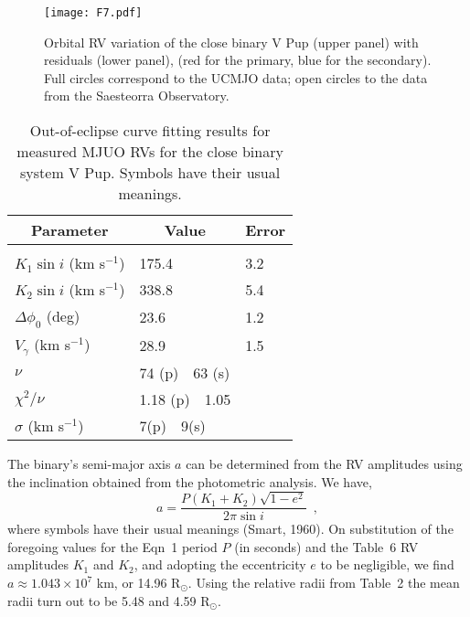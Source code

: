\documentclass[useAMS,usenatbib]{mnras}                                                                           \usepackage[pdftex]{graphicx}
\begin{document}
\begin{figure}
\label{fig-8}
\centering
\texttt{[image: F7.pdf]}\\
\caption{Orbital RV variation of the close binary V Pup (upper panel)
with residuals (lower panel),
(red for the primary, blue for the secondary).
Full circles correspond to the UCMJO data; open circles to the 
data from the Saesteorra Observatory.
}
\end{figure}
 
\begin{table}
\begin{center}
\caption{Out-of-eclipse curve fitting results for
measured MJUO RVs for the close binary system V Pup. 
Symbols have their usual meanings.
\label{tbl-6a}} 
\begin{tabular}{lll}
\hline 
\multicolumn{1}{c}{Parameter}  & \multicolumn{1}{c}{Value}  & 
\multicolumn{1}{c}{Error}\\
\hline \\
$K_1 \sin i$ (km s$^{-1}$) & 175.4  & 3.2\\
$K_2 \sin i$ (km s$^{-1}$) & 338.8  & 5.4\\
$\Delta \phi_0$ (deg)             & 23.6   & 1.2  \\
$V_\gamma$ (km s$^{-1}$)     & 28.9 &  1.5\\
$\nu$     &  74 (p) \,\, 63 (s)  &   \\
$\chi^2/\nu$ & 1.18 (p) \,\, 1.05  & \\
$\sigma $ (km s$^{-1}$) & 7(p) \,\, 9(s)  & \\
\hline
\end{tabular}
\end{center}
\end{table} 
 
 
The binary's semi-major axis $a$ can be determined from the
RV amplitudes using the inclination 
obtained from the photometric analysis.
We have,
\begin{equation}
a = \frac{P(K_1 + K_2) \sqrt{1 - e^2}}{ 2\pi \sin i}  \,\,\,  ,
\end{equation}   
where symbols have their usual meanings (Smart, 1960).
 On substitution of the foregoing values for the Eqn~1 period $P$ (in seconds) and
 the Table~6 RV amplitudes $K_1$ and $K_2$, and adopting the eccentricity 
 $e$ to be negligible, we find $a \approx 1.043 \times 10^7$ km,
 or 14.96 R$_{\odot}$.  Using the relative radii from Table~2 
 the mean radii turn out to be 5.48 and 4.59 R$_{\odot}$.
 
\end{document}
